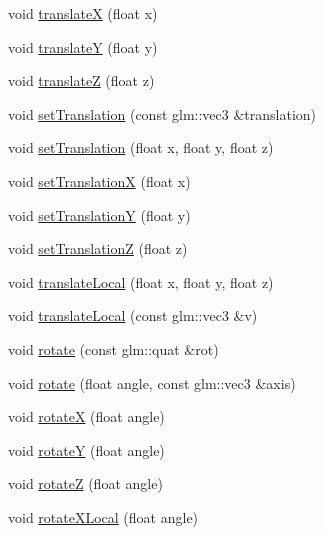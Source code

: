 \begin{DoxyCompactItemize}
void \mbox{\hyperlink{classec_1_1_transform3_d_a6e8e6da470c6a080b669cd619e8554ef}{translateX}} (float x)
\item 
void \mbox{\hyperlink{classec_1_1_transform3_d_ab0c9d7ff73b744c480914b7d2aaabf81}{translateY}} (float y)
\item 
void \mbox{\hyperlink{classec_1_1_transform3_d_a13ea4d1c69ec17c2ce4c1d8b4068639a}{translateZ}} (float z)
\item 
void \mbox{\hyperlink{classec_1_1_transform3_d_a2866183fe28eb5e5360d156830b00655}{set\+Translation}} (const glm\+::vec3 \&translation)
\item 
void \mbox{\hyperlink{classec_1_1_transform3_d_a2671c96409a11a74d9c7cb96d96b274b}{set\+Translation}} (float x, float y, float z)
\item 
void \mbox{\hyperlink{classec_1_1_transform3_d_a51d65455864ed3595a53c40d2f576067}{set\+TranslationX}} (float x)
\item 
void \mbox{\hyperlink{classec_1_1_transform3_d_aa9d5eab59374d5e900c17c02a4c64b2f}{set\+TranslationY}} (float y)
\item 
void \mbox{\hyperlink{classec_1_1_transform3_d_aeddca7f4f74afd8394810222684fad30}{set\+TranslationZ}} (float z)
\item 
void \mbox{\hyperlink{classec_1_1_transform3_d_aa32ee07603a9531e77b189185cbd40e4}{translate\+Local}} (float x, float y, float z)
\item 
void \mbox{\hyperlink{classec_1_1_transform3_d_a8769dc2eb4f1cd467d8e39c85decdd10}{translate\+Local}} (const glm\+::vec3 \&v)
\item 
void \mbox{\hyperlink{classec_1_1_transform3_d_a24885ce6a9f002a00f7c263e4076ea6b}{rotate}} (const glm\+::quat \&rot)
\item 
void \mbox{\hyperlink{classec_1_1_transform3_d_ac9787bc7e772a5ef4f9a7ed36be1ae10}{rotate}} (float angle, const glm\+::vec3 \&axis)
\item 
void \mbox{\hyperlink{classec_1_1_transform3_d_a620c1729b027b54d0cabe03a8cdc9253}{rotateX}} (float angle)
\item 
void \mbox{\hyperlink{classec_1_1_transform3_d_a3e365a26befa6aabeb2e0b3ca680dd4f}{rotateY}} (float angle)
\item 
void \mbox{\hyperlink{classec_1_1_transform3_d_afb339cf9f8c44fa6db954eb82af63c5b}{rotateZ}} (float angle)
\item 
void \mbox{\hyperlink{classec_1_1_transform3_d_a7124a324cea1d06b438248003d332ee2}{rotate\+X\+Local}} (float angle)
\item 

\end{DoxyCompactItemize}
